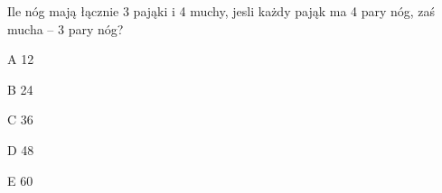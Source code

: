 \begin{tresc}
Ile nóg mają łącznie 3 pająki i 4 muchy, jesli każdy pająk ma 4 pary nóg, zaś mucha – 3 pary nóg?
\end{tresc}
\begin{wariant}{A} 12 \end{wariant}
\begin{wariant}{B} 24 \end{wariant}
\begin{wariant}{C} 36 \end{wariant}
\begin{wariant}{D} 48 \end{wariant}
\begin{wariant}{E} 60 \end{wariant}
